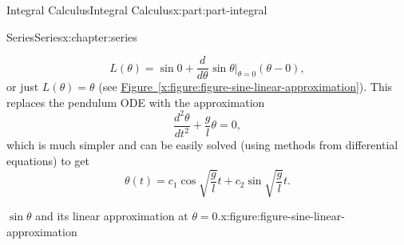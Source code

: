 \documentclass[twoside,10pt,]{tufte-book}
\newcommand{\xreffont}{\relax}
\numberwithin{equation}{part}
\newcommand{\dv}[3][]{\dfrac{d^{#1} #2}{d #3^{#1}}}
\begin{document}
\begin{partptx}{Integral Calculus}{}{Integral Calculus}{}{}{x:part:part-integral}
\begin{chapterptx}{Series}{}{Series}{}{}{x:chapter:series}
\begin{introduction}{}
\begin{equation*}
L(\theta) = \sin0 + \dv{}{\theta}\sin\theta\Big|_{\theta= 0}(\theta - 0),
\end{equation*}
or just \(L(\theta) = \theta\) (see \hyperref[x:figure:figure-sine-linear-approximation]{Figure~{\xreffont\ref{x:figure:figure-sine-linear-approximation}}}). This replaces the pendulum ODE with the approximation%
\begin{equation*}
\dv[2]{\theta}{t} + \frac{g}{l}\theta = 0,
\end{equation*}
which is much simpler and can be easily solved (using methods from differential equations) to get%
\begin{equation*}
\theta(t) = c_{1}\cos\sqrt{\frac{g}{l}}t + c_{2}\sin\sqrt{\frac{g}{l}}t.
\end{equation*}
%
\begin{figureptx}{\(\sin\theta\) and its linear approximation at \(\theta=0\).}{x:figure:figure-sine-linear-approximation}{}%
\begin{image}{0}{1}{0}%
\end{image}
\end{figureptx}
\end{introduction}
\end{chapterptx}
\end{partptx}
\end{document}
